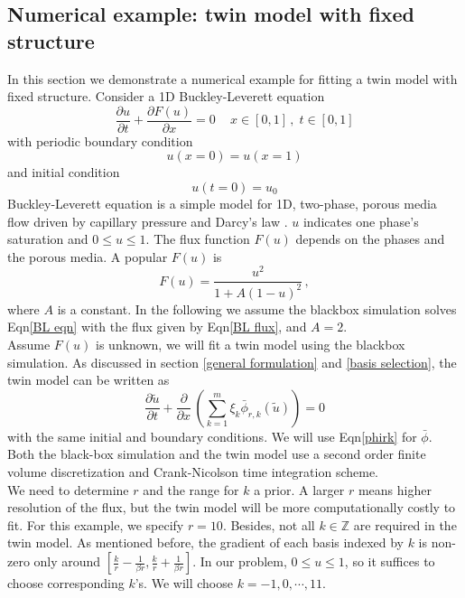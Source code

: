 \documentclass[a4paper,onecolumn]{article}
\theoremstyle{remark}
\begin{document}
\subsection{Numerical example: twin model with fixed structure}
\label{fixed numerical example}
In this section we demonstrate a numerical example for fitting a twin model with fixed structure.
Consider a 1D Buckley-Leverett equation
\begin{equation}
    \frac{\partial u}{\partial t} + \frac{\partial F(u)}{\partial x} = 0\,\quad x\in[0,1]\,,\; t\in[0,1]
    \label{BL eqn}
\end{equation}
with periodic boundary condition
\begin{equation}
    u(x=0) = u(x=1)
\end{equation}
and initial condition
\begin{equation}
    u(t=0) = u_0
\end{equation}
Buckley-Leverett equation is a simple model for 1D, two-phase, porous media flow driven by
capillary pressure and Darcy's law \cite{Buckley Leverett}. $u$
indicates one phase's saturation and $0\le u\le 1$.
The flux function $F(u)$ depends on the phases and the porous media. 
A popular $F(u)$ is
\begin{equation}
    F(u) = \frac{u^2}{1+A(1-u)^2}\,,
    \label{BL flux}
\end{equation}
where $A$ is a constant. In the following we assume the blackbox simulation
solves Eqn\eqref{BL eqn} with the flux given by Eqn\eqref{BL flux}, and $A=2$.
\\

\noindent Assume $F(u)$ is unknown, we will fit a twin model 
using the blackbox simulation.
As discussed in section \ref{general formulation} and
\ref{basis selection}, the twin model can be written as
\begin{equation}
    \frac{\partial \tilde{u}}{\partial t} + \frac{\partial}{\partial x}\,
    \left(\sum_{k=1}^m \xi_k \bar{\phi}_{r,k}(\tilde{u})\right) = 0
    \label{twin model 3}
\end{equation}
with the same initial and boundary conditions. We will
use Eqn\eqref{phirk} for $\bar{\phi}$. Both the black-box simulation
and the twin model use a second order finite volume discretization and 
Crank-Nicolson time integration scheme.\\

\noindent We need to determine $r$ and the range for $k$ a prior. 
A larger $r$  means higher resolution of the flux, but the twin model will be
more computationally costly to fit. For this example,
we specify $r=10$. Besides, not all $k\in \mathbb{Z}$
are required in the twin model. As mentioned before, the gradient of
each basis indexed by $k$ is non-zero only around $[\frac{k}{r}-\frac{1}{\beta r},
\frac{k}{r}+\frac{1}{\beta r}]$. In our problem, $0\le u\le 1$, so it suffices
to choose corresponding $k$'s. We will choose $k=-1,0,\cdots, 11$.\\
\end{document}
